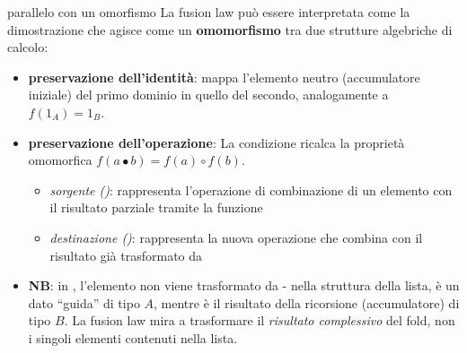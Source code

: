 \documentclass[a4paper,11pt]{report}
\begin{document}
\begin{gframe}{parallelo con un omorfismo}
    La fusion law può essere interpretata come la dimostrazione che  agisce come un \textbf{omomorfismo} tra due strutture algebriche di calcolo:
\begin{itemize}
    \item \textbf{preservazione dell'identità}:  mappa l'elemento neutro (accumulatore iniziale) del primo dominio in quello del secondo, analogamente a $f(1_A) = 1_B$.
    \item \textbf{preservazione dell'operazione}: La condizione  ricalca la proprietà omomorfica $f(a \bullet b) = f(a) \circ f(b)$. 
    \begin{itemize}
        \item \textit{sorgente ()}: rappresenta l'operazione di combinazione di un elemento  con il risultato parziale  tramite la funzione 
        \item \textit{destinazione ()}: rappresenta la nuova operazione  che combina  con il risultato già trasformato da 
    \end{itemize}
\item \textbf{NB}: in , l'elemento  non viene trasformato da  - nella struttura della lista,  è un dato ``guida'' di tipo $A$, mentre  è il risultato della ricorsione (accumulatore) di tipo $B$. La fusion law mira a trasformare il \textit{risultato complessivo} del fold, non i singoli elementi contenuti nella lista.
\end{itemize}
\end{gframe}
\end{document}
